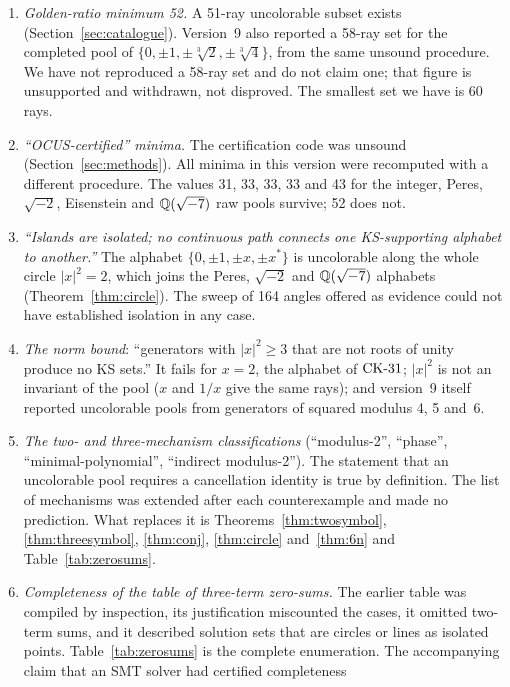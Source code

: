 \begin{enumerate}[label=C\arabic*.,leftmargin=2.6em]
\item \emph{Golden-ratio minimum 52.}  A 51-ray uncolorable subset exists
(Section~\ref{sec:catalogue}).  Version~9 also reported a 58-ray set for the completed pool of
$\{0,\pm1,\pm\sqrt[3]2,\pm\sqrt[3]4\}$, from the same unsound procedure.  We have not reproduced
a 58-ray set and do not claim one; that figure is unsupported and withdrawn, not disproved.  The
smallest set we have is 60 rays.
\item \emph{``OCUS-certified'' minima.}  The certification code was unsound
(Section~\ref{sec:methods}).  All minima in this version were recomputed with a different
procedure.  The values 31, 33, 33, 33 and 43 for the integer, Peres, $\sqrt{-2}$, Eisenstein and
$\mathbb{Q}(\sqrt{-7})$ raw pools survive; 52 does not.
\item \emph{``Islands are isolated; no continuous path connects one KS-supporting alphabet to
another.''}  The alphabet $\{0,\pm1,\pm x,\pm x^{*}\}$ is uncolorable along the whole circle
$|x|^2=2$, which joins the Peres, $\sqrt{-2}$ and $\mathbb{Q}(\sqrt{-7})$ alphabets
(Theorem~\ref{thm:circle}).  The sweep of 164 angles offered as evidence could not have
established isolation in any case.
\item \emph{The norm bound}: ``generators with $|x|^2\ge3$ that are not roots of unity produce no
KS sets.''  It fails for $x=2$, the alphabet of $\mathrm{CK}\text{-}31$; $|x|^2$ is not an invariant of the pool
($x$ and $1/x$ give the same rays); and version~9 itself reported uncolorable pools from
generators of squared modulus 4, 5 and~6.
\item \emph{The two- and three-mechanism classifications} (``modulus-2'', ``phase'',
``minimal-polynomial'', ``indirect modulus-2'').  The statement that an uncolorable pool requires
a cancellation identity is true by definition.  The list of mechanisms was extended after each
counterexample and made no prediction.  What replaces it is
Theorems~\ref{thm:twosymbol}, \ref{thm:threesymbol}, \ref{thm:conj}, \ref{thm:circle}
and~\ref{thm:6n} and Table~\ref{tab:zerosums}.
\item \emph{Completeness of the table of three-term zero-sums.}  The earlier table was compiled
by inspection, its justification miscounted the cases, it omitted two-term sums, and it described
solution sets that are circles or lines as isolated points.  Table~\ref{tab:zerosums} is the
complete enumeration.  The accompanying claim that an SMT solver had certified completeness

\end{enumerate}

